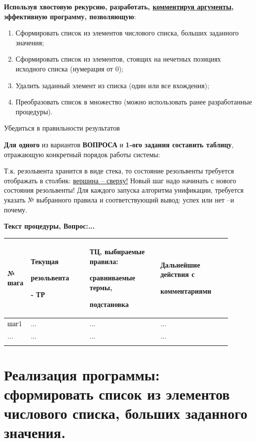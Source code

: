 \documentclass[a4paper,12pt]{article}
\begin{document}
	{\bf Используя хвостовую рекурсию, разработать, \underline{комментируя аргументы}, эффективную программу, позволяющую}:
	
	\begin{enumerate}
		\item Сформировать список из элементов числового списка, больших заданного значения;
		\item Сформировать список из элементов, стоящих на нечетных позициях исходного списка (нумерация от 0);
		\item Удалить заданный элемент из списка (один или все вхождения);
		\item Преобразовать список в множество (можно использовать ранее разработанные процедуры).
	\end{enumerate}

	Убедиться в правильности результатов
	
	{\bf Для одного} из вариантов {\bf ВОПРОСА} и {\bf 1-ого задания  составить таблицу}, отражающую конкретный порядок работы системы:
	
	Т.к. резольвента хранится в виде стека, то состояние резольвенты требуется отображать в столбик: \underline{вершина – сверху!} Новый шаг надо начинать с нового состояния резольвенты! Для каждого запуска алгоритма унификации, требуется указать № выбранного правила и соответствующий вывод: успех или нет –и почему.
	


{\bf Текст процедуры,      Вопрос:...}

\begin{center}
	\begin{longtable}[h!]{|p{0.05\linewidth}|p{0.25\linewidth}|p{ 0.3\linewidth}|p{ 0.3\linewidth}|}
		\hline
		{№ шага} & {Текущая
		
	резольвента

- ТР} & {ТЦ, выбираемые правила:

сравниваемые термы,

подстановка} & {Дальнейшие действия с 
			
комментариями}\\
		\hline
		{шаг1} & {...} & {...} & {...}\\
		\hline
		{...} & {...} & {...} & {...}\\
		\hline
		\label{m1}
	\end{longtable}
\end{center}

\newpage

\section*{Реализация программы: сформировать список из элементов числового списка, больших заданного значения.}
\end{document}
